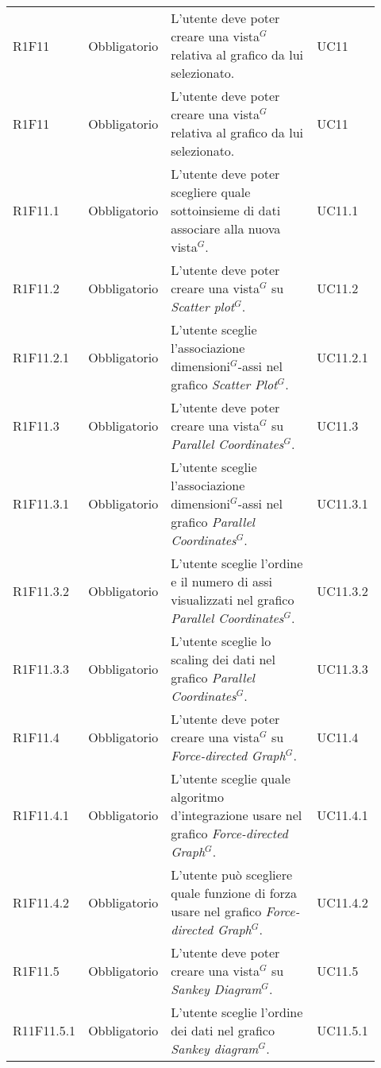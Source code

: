 {\begin{longtable}{p{0.12\linewidth}p{0.15\linewidth}p{0.50\linewidth}p{0.15\linewidth}}
    \rowcolor[RGB]{216, 235, 171}
    R1F11 & Obbligatorio & L'utente deve poter creare una vista$^{G}$ relativa al grafico da lui selezionato. & UC11\\
    \rowcolor[RGB]{233, 245, 206}
    R1F11 & Obbligatorio & L'utente deve poter creare una vista$^{G}$ relativa al grafico da lui selezionato. & UC11\\ 
    \rowcolor[RGB]{216, 235, 171}
    R1F11.1 & Obbligatorio & L'utente deve poter scegliere quale sottoinsieme di dati associare alla nuova vista$^{G}$. & UC11.1\\
    \rowcolor[RGB]{216, 235, 171}
    R1F11.2 & Obbligatorio & L'utente deve poter creare una vista$^{G}$ su \textit{Scatter plot$^{G}$}. & UC11.2\\
    \rowcolor[RGB]{216, 235, 171}
    R1F11.2.1 & Obbligatorio & L'utente sceglie l'associazione dimensioni$^{G}$-assi nel grafico \textit{Scatter Plot$^{G}$}. & UC11.2.1\\
    \rowcolor[RGB]{233, 245, 206}
    R1F11.3 & Obbligatorio & L'utente deve poter creare una vista$^{G}$ su \textit{Parallel Coordinates$^{G}$}. & UC11.3\\
    \rowcolor[RGB]{216, 235, 171}
    R1F11.3.1 & Obbligatorio & L'utente sceglie l'associazione dimensioni$^{G}$-assi nel grafico \textit{Parallel Coordinates$^{G}$}. & UC11.3.1\\
    \rowcolor[RGB]{233, 245, 206}
    R1F11.3.2 & Obbligatorio & L'utente sceglie l'ordine e il numero di assi visualizzati nel grafico \textit{Parallel Coordinates$^{G}$}. &UC11.3.2\\
    \rowcolor[RGB]{216, 235, 171}
    R1F11.3.3 & Obbligatorio & L'utente sceglie lo scaling dei dati nel grafico \textit{Parallel Coordinates$^{G}$}. & UC11.3.3\\
    \rowcolor[RGB]{233, 245, 206}
    R1F11.4 & Obbligatorio & L'utente deve poter creare una vista$^{G}$ su \textit{Force-directed Graph$^{G}$}. & UC11.4\\
    \rowcolor[RGB]{216, 235, 171}
    R1F11.4.1 & Obbligatorio & L'utente sceglie quale algoritmo d'integrazione usare nel grafico \textit{Force-directed Graph$^{G}$}. & UC11.4.1\\
    \rowcolor[RGB]{233, 245, 206}
    R1F11.4.2 & Obbligatorio & L'utente può scegliere quale funzione di forza usare nel grafico \textit{Force-directed Graph$^{G}$}. & UC11.4.2\\
    \rowcolor[RGB]{216, 235, 171}
    R1F11.5 & Obbligatorio & L'utente deve poter creare una vista$^{G}$ su \textit{Sankey Diagram$^{G}$}. & UC11.5\\
    \rowcolor[RGB]{233, 245, 206}
    R11F11.5.1 & Obbligatorio & L'utente sceglie l'ordine dei dati nel grafico \textit{Sankey diagram$^{G}$}. & UC11.5.1\\


\end{longtable}}
